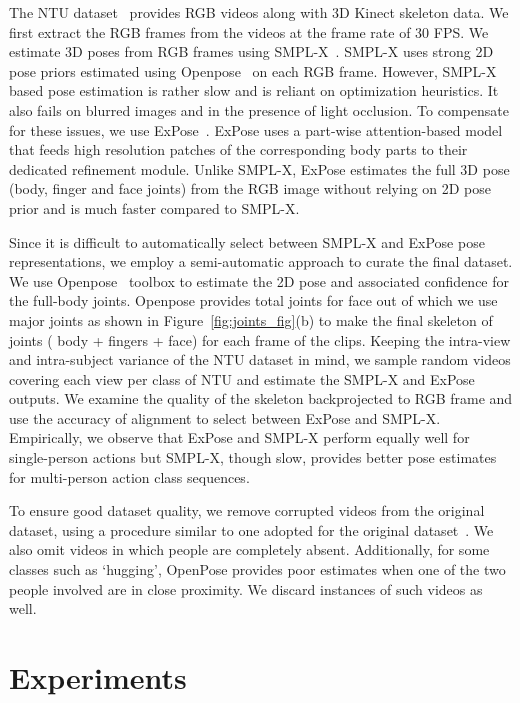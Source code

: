 \documentclass{article}
\begin{document}
The NTU dataset~\cite{Shahroudy_2016_CVPR} provides RGB videos along with 3D Kinect skeleton data. We first extract the RGB frames from the videos at the frame rate of 30 FPS. We estimate 3D poses from RGB frames using SMPL-X~\cite{SMPL-X:2019}. SMPL-X uses strong 2D pose priors estimated using Openpose~\cite{cao2018openpose} on each RGB frame. However, SMPL-X based pose estimation is rather slow and is reliant on optimization heuristics. It also fails on blurred images and in the presence of light occlusion. To compensate for these issues, we use ExPose~\cite{ExPose:2020}. ExPose uses a part-wise attention-based model that feeds high resolution patches of the corresponding body parts to their dedicated refinement module. Unlike SMPL-X, ExPose estimates the full 3D pose (body, finger and face joints) from the RGB image without relying on 2D pose prior and is much faster compared to SMPL-X.

Since it is difficult to automatically select between SMPL-X and ExPose pose representations, we employ a semi-automatic approach to curate the final dataset. We use Openpose~\cite{cao2018openpose} toolbox to estimate the 2D pose and associated confidence for the full-body joints. Openpose provides total  joints for face out of which we use  major joints as shown in Figure~\ref{fig:joints_fig}(b) to make the final skeleton of  joints ( body +  fingers +  face) for each frame of the clips. Keeping the intra-view and intra-subject variance of the NTU dataset in mind, we sample random videos covering each view per class of NTU and estimate the SMPL-X and ExPose outputs. We examine the quality of the skeleton backprojected to RGB frame and use the accuracy of alignment to select between ExPose and SMPL-X. Empirically, we observe that ExPose and SMPL-X perform equally well for single-person actions but SMPL-X, though slow, provides better pose estimates for multi-person action class sequences. 

To ensure good dataset quality, we remove corrupted videos from the original dataset, using a procedure similar to one adopted for the original dataset~\cite{Shahroudy_2016_CVPR}. We also omit videos in which people are completely absent. Additionally, for some  classes such as `hugging', OpenPose provides poor estimates when one of the two people involved are in close proximity. We discard instances of such videos as well.

\section{Experiments}
\label{sec:experiments}
\end{document}
